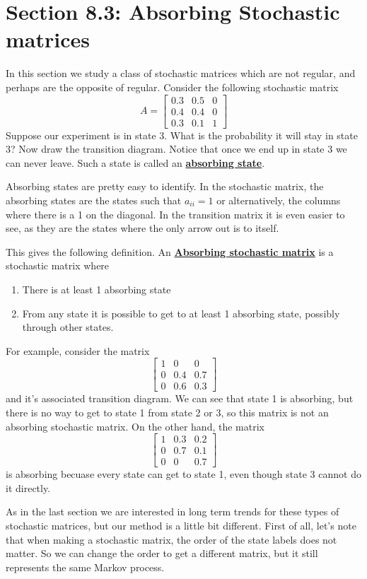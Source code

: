 \documentclass[14,fleqn]{article}
\newcommand{\defn}[1]{\textbf{\underline{#1}}}
\begin{document}
\section{Section 8.3: Absorbing Stochastic matrices}

In this section we study a class of stochastic matrices which are not regular, and perhaps are the opposite of regular. Consider the following stochastic matrix
\[
	A=\begin{bmatrix} 0.3&0.5&0\\0.4&0.4&0\\0.3&0.1&1\end{bmatrix}
\]
Suppose our experiment is in state 3. What is the probability it will stay in state 3? Now draw the transition diagram. Notice that once we end up in state 3 we can never leave. Such a state is called an \defn{absorbing state}.

Absorbing states are pretty easy to identify. In the stochastic matrix, the absorbing states are the states such that $a_{ii}=1$ or alternatively, the columns where there is a 1 on the diagonal. In the transition matrix it is even easier to see, as they are the states where the only arrow out is to itself.

This gives the following definition. An \defn{Absorbing stochastic matrix} is a stochastic matrix where
\begin{enumerate}
	\item There is at least 1 absorbing state
	\item From any state it is possible to get to at least 1 absorbing state, possibly through other states.
\end{enumerate}

For example, consider the matrix
\[
	\begin{bmatrix}1&0&0\\0&0.4&0.7\\0&0.6&0.3\end{bmatrix}
\]
and it's associated transition diagram. We can see that state 1 is absorbing, but there is no way to get to state 1 from state 2 or 3, so this matrix is not an absorbing stochastic matrix. On the other hand, the matrix
\[
	\begin{bmatrix}1&0.3&0.2\\0&0.7&0.1\\0&0&0.7\end{bmatrix}
\]
is absorbing becuase every state can get to state 1, even though state 3 cannot do it directly.

As in the last section we are interested in long term trends for these types of stochastic matrices, but our method is a little bit different. First of all, let's note that when making a stochastic matrix, the order of the state labels does not matter. So we can change the order to get a different matrix, but it still represents the same Markov process.
\end{document}
